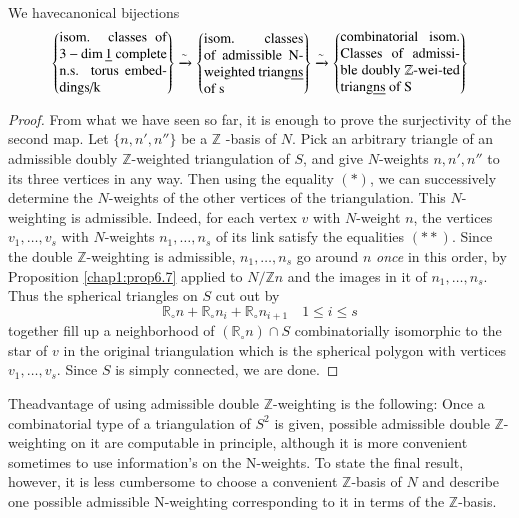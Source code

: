 \begin{prop}\label{chap1:prop9.1}%
We have\pageoriginale canonical bijections
$$
\left \{\begin{minipage}{2.7cm}
{isom. classes of $3-\dim \underbar{1}$
  complete n.s. torus embeddings/k } 
\end{minipage} \right\}
\xrightarrow{\sim}
\left\{\begin{minipage}{2.5cm}
{isom. classes of admissible N-weighted triang$\underbar{ns}$ of
  s}
 \end{minipage}\right\} 
 \xrightarrow{\sim}\left
\{\begin{minipage}{3cm}
 {combinatorial isom. Classes of admissible
    doubly $\mathbb{Z}$-wei-ted triang$\underbar{ns}$ of S}
\end{minipage}\right \} 
$$
\end{prop}

\begin{proof}
From what we have seen so far, it is enough to prove the surjectivity
of the second map. Let $\{n,n',n''\}$ be a $\mathbb{Z}$ -basis  of
$N$. Pick an arbitrary triangle of an admissible doubly
$\mathbb{Z}$-weighted triangulation of $S$, and give $N$-weights
$n,n',n''$  to its three vertices in any way. Then using the
equality $(*)$, we can successively determine the $N$-weights of the
other vertices of the  triangulation. This $N$-weighting  is
admissible. Indeed, for each vertex $v$ with $N$-weight $n$, the
vertices  $v_1 , \ldots , v_s$  with $N$-weights $n_1 , \ldots , n_s$
of its link satisfy the equalities  $(**)$. Since the double
$\mathbb{Z}$-weighting  is admissible, $n_1 , \ldots , n_s$ go  around
$n$ \textit{once} in this order, by Proposition \ref{chap1:prop6.7} applied to
$N/\mathbb{Z}n$ and the images in it of  $n_1 , \ldots , n_s$. Thus
the spherical triangles on $S$ cut out  by  
$$
\mathbb{R}_\circ n + \mathbb{R}_\circ n_i + \mathbb{R}_\circ n_{i+1}
\quad  1\leq i \leq s  
$$
together fill up a neighborhood of $(\mathbb{R}_\circ n)\cap S$ combinatorially
isomorphic to the  star of $v$ in the original triangulation which is
the spherical  polygon with vertices  $v_1 , \ldots , v_s$. Since $S$
is simply connected, we are done. 
\end{proof}

\begin{remark*}
The\pageoriginale advantage of using admissible double
$\mathbb{Z}$-weighting is  
the following: Once a combinatorial type of a triangulation of $S^2$
is given, possible admissible double $\mathbb{Z}$-weighting on it are
computable in principle, although it is more convenient sometimes to
use information's on the N-weights. To state the final result, however,
it is less cumbersome to choose a convenient $\mathbb{Z}$-basis of $N$
and describe one possible admissible N-weighting corresponding to it
in terms of the $\mathbb{Z}$-basis.  
\end{remark*}

